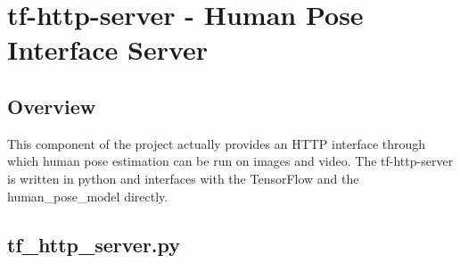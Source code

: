\documentclass{scrreprt}
\begin{document}
\section{tf-http-server - Human Pose Interface Server}

\subsection{Overview}

This component of the project actually provides an HTTP interface through which
human pose estimation can be run on images and video. The tf-http-server is
written in python and interfaces with the TensorFlow and the human\_pose\_model
directly.

\subsection{tf\_http\_server.py}
\end{document}
